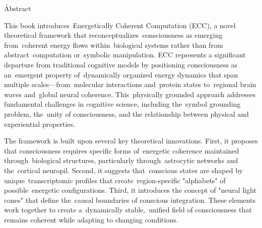 \h{Abstract}

This book introduces~Energetically Coherent Computation (ECC), a novel theoretical framework that reconceptualizes~consciousness as emerging from~coherent energy flows within~biological systems rather than from abstract~computation or~symbolic manipulation. ECC represents a significant departure from traditional cognitive models by positioning consciousness as an~emergent property of~dynamically organized energy dynamics that span multiple scales—from~molecular interactions and~protein states to~regional brain waves and~global neural coherence. This~physically grounded approach addresses fundamental challenges in cognitive science, including the~symbol grounding problem, the~unity of consciousness, and the relationship between physical and experiential properties.

The framework is built upon several key theoretical innovations. First, it proposes that consciousness requires specific forms of~energetic coherence maintained through~biological structures, particularly through~astrocytic networks and the~cortical neuropil. Second, it suggests that~conscious states are shaped by unique~transcriptomic profiles that create~region-specific "alphabets" of possible~energetic configurations. Third, it introduces the concept of "neural light cones" that define the~causal boundaries of conscious integration. These elements work together to create a~dynamically stable,~unified field of consciousness that remains coherent while adapting to changing conditions.

